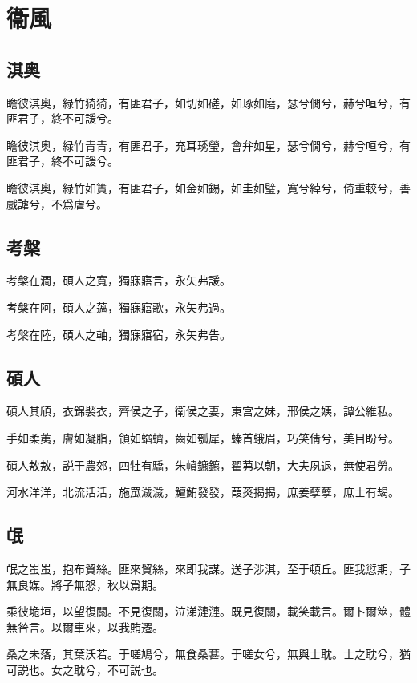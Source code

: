 \section[衞風]{衞風}

\subsection[淇奥]{淇奥}

瞻彼淇奥，緑竹猗猗，有匪君子，如切如磋，如琢如磨，瑟兮僩兮，赫兮咺兮，有匪君子，終不可諼兮。

瞻彼淇奥，緑竹青青，有匪君子，充耳琇瑩，會弁如星，瑟兮僩兮，赫兮咺兮，有匪君子，終不可諼兮。

瞻彼淇奥，緑竹如簀，有匪君子，如金如錫，如圭如璧，寬兮綽兮，倚重較兮，善戲謔兮，不爲虐兮。

\subsection[考槃]{考槃}

考槃在澗，碩人之寬，獨寐寤言，永矢弗諼。

考槃在阿，碩人之薖，獨寐寤歌，永矢弗過。

考槃在陸，碩人之軸，獨寐寤宿，永矢弗告。

\subsection[碩人]{碩人}

碩人其頎，衣錦褧衣，齊侯之子，衛侯之妻，東宫之妹，邢侯之姨，譚公維私。

手如柔荑，膚如凝脂，領如蝤蠐，齒如瓠犀，螓首蛾眉，巧笑倩兮，美目盼兮。

碩人敖敖，説于農郊，四牡有驕，朱幩鑣鑣，翟茀以朝，大夫夙退，無使君勞。

河水洋洋，北流活活，施罛濊濊，鱣鮪發發，葭菼揭揭，庶姜孽孽，庶士有朅。

\subsection[氓]{氓}

氓之蚩蚩，抱布貿絲。匪來貿絲，來即我謀。送子涉淇，至于頓丘。匪我愆期，子無良媒。將子無怒，秋以爲期。

乘彼垝垣，以望復關。不見復關，泣涕漣漣。既見復關，載笑載言。爾卜爾筮，體無咎言。以爾車來，以我賄遷。

桑之未落，其葉沃若。于嗟鳩兮，無食桑葚。于嗟女兮，無與士耽。士之耽兮，猶可説也。女之耽兮，不可説也。

